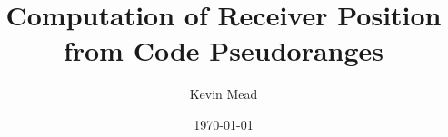 \documentclass[a4paper,11pt]{article}
\begin{document}
 
\title{Computation of Receiver Position from Code Pseudoranges}
\author{Kevin Mead}

\date{\today} 
\maketitle 








\end{document}
